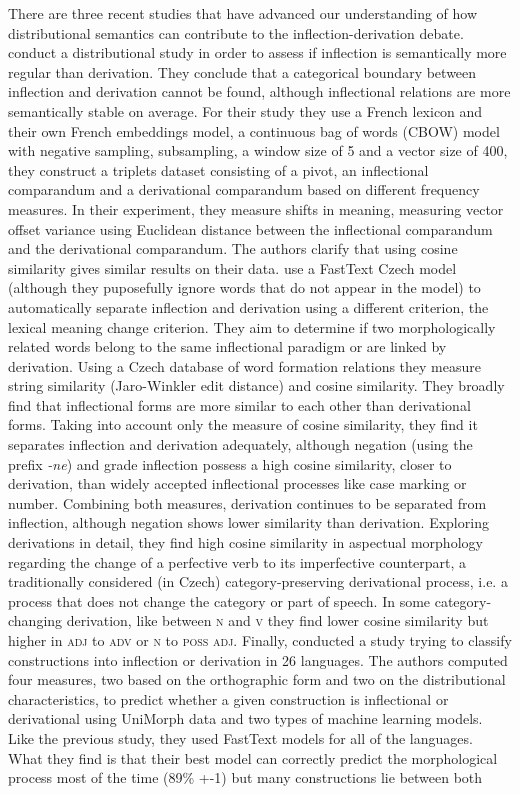 \documentclass[12pt]{article}
\newcommand{\ita}[1]{\textit{#1}}
\begin{document}
There are three recent studies that have advanced our understanding of how distributional semantics can contribute to the inflection-derivation debate. \textcite{bonami2018InflectionVsDerivation} conduct a distributional study in order to assess if inflection is semantically more regular than derivation. They conclude that a categorical boundary between inflection and derivation cannot be found, although inflectional relations are more semantically stable on average. For their study they use a French lexicon and their own French embeddings model, a continuous bag of words (CBOW) model with negative sampling, subsampling, a window size of 5 and a vector size of 400, they construct a triplets dataset consisting of a pivot, an inflectional comparandum and a derivational comparandum based on different frequency measures. In their experiment, they measure shifts in meaning, measuring vector offset variance using Euclidean distance between the inflectional comparandum and the derivational comparandum. The authors clarify that using cosine similarity gives similar results on their data. \textcite{rosa2019AttemptingSeparateInflection} use a FastText Czech model (although they puposefully ignore words that do not appear in the model) to automatically separate inflection and derivation using a different criterion, the lexical meaning change criterion. They aim to determine if two morphologically related words belong to the same inflectional paradigm or are linked by derivation. Using a Czech database of word formation relations they measure string similarity (Jaro-Winkler edit distance) and cosine similarity. They broadly find that inflectional forms are more similar to each other than derivational forms. Taking into account only the measure of cosine similarity, they find it separates inflection and derivation adequately, although negation (using the prefix \ita{-ne}) and grade inflection possess a high cosine similarity, closer to derivation, than widely accepted inflectional processes like case marking or number. Combining both measures, derivation continues to be separated from inflection, although negation shows lower similarity than derivation. Exploring derivations in detail, they find high cosine similarity in aspectual morphology regarding the change of a perfective verb to its imperfective counterpart, a traditionally considered (in Czech) category-preserving derivational process, i.e. a process that does not change the category or part of speech. In some category-changing derivation, like between \textsc{n} and \textsc{v} they find lower cosine similarity but higher in \textsc{adj} to \textsc{adv} or \textsc{n} to \textsc{poss adj}. Finally, \textcite{haley2024CorpusbasedMeasuresDiscriminate} conducted a study trying to classify constructions into inflection or derivation in 26 languages. The authors computed four measures, two based on the orthographic form and two on the distributional characteristics, to predict whether a given construction is inflectional or derivational using UniMorph data and two types of machine learning models. Like the previous study, they used FastText models for all of the languages. What they find is that their best model can correctly predict the morphological process most of the time (89\% +-1) but many constructions lie between both 
\end{document}
